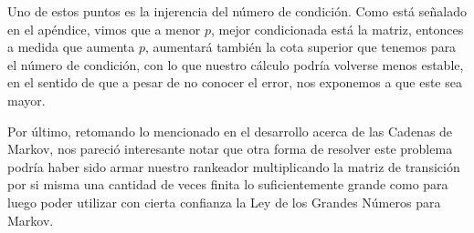 Uno de estos puntos es la injerencia del n\'umero de condici\'on.\newline
Como est\'a señalado en el ap\'endice, vimos que a menor $p$, mejor condicionada est\'a la matriz, entonces a medida que aumenta $p$, 
aumentar\'a tambi\'en la cota superior que tenemos para el n\'umero de condici\'on, con lo que nuestro c\'alculo podr\'ia volverse menos estable, 
en el sentido de que a pesar de no conocer el error, nos exponemos a que este sea mayor.
\\
\par
Por \'ultimo, retomando lo mencionado en el desarrollo acerca de las Cadenas de Markov, nos pareci\'o interesante notar que otra forma de resolver este problema podr\'ia haber sido armar nuestro rankeador multiplicando la matriz de transici\'on por si misma una cantidad de veces finita lo suficientemente grande como para luego poder utilizar con cierta confianza la Ley de los Grandes N\'umeros para Markov.